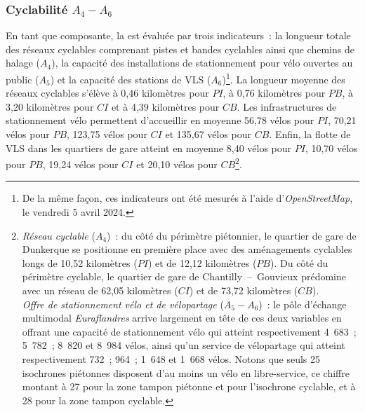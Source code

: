 \begin{refsegment}
\subsubsection*{Cyclabilité \(A_{4} - A_{6}\)
    \label{chap6:indicateurs-accessibility-cyclabilite}
    }

En tant que composante, la  est évaluée par trois indicateurs~: la longueur totale des réseaux cyclables comprenant pistes et bandes cyclables ainsi que chemins de halage (\(A_{4}\)), la capacité des installations de stationnement pour vélo ouvertes au public (\(A_{5}\)) et la capacité des stations de \acrshort{VLS} (\(A_{6}\))\footnote{
    De la même façon, ces indicateurs ont été mesurés à l'aide d'\textsl{OpenStreetMap}, le vendredi 5 avril 2024.
}. La longueur moyenne des réseaux cyclables s'élève à 0,46 kilomètres pour \(PI\), à 0,76 kilomètres pour \(PB\), à 3,20 kilomètres pour \(CI\) et à 4,39 kilomètres pour \(CB\). Les infrastructures de stationnement vélo permettent d'accueillir en moyenne 56,78 vélos pour \(PI\), 70,21 vélos pour \(PB\), 123,75 vélos pour \(CI\) et 135,67 vélos pour \(CB\). Enfin, la flotte de \acrshort{VLS} dans les quartiers de gare atteint en moyenne 8,40 vélos pour \(PI\), 10,70 vélos pour \(PB\), 19,24 vélos pour \(CI\) et 20,10 vélos pour \(CB\)\footnote{
    \textsl{Réseau cyclable} (\(A_{4}\))~: du côté du périmètre piétonnier, le quartier de gare de Dunkerque se positionne en première place avec des aménagements cyclables longs de 10,52 kilomètres (\(PI\)) et de 12,12 kilomètres (\(PB\)). Du côté du périmètre cyclable, le quartier de gare de Chantilly~–~Gouvieux prédomine avec un réseau de 62,05 kilomètres (\(CI\)) et de 73,72 kilomètres (\(CB\)).
    \\
    \textsl{Offre de stationnement vélo et de vélopartage} (\(A_{5} - A_{6}\))~: le pôle d'échange multimodal \textsl{Euraflandres} arrive largement en tête de ces deux variables en offrant une capacité de stationnement vélo qui atteint respectivement 4~683~; 5~782~; 8~820 et 8~984 vélos, ainsi qu'un service de vélopartage qui atteint respectivement 732~; 964~; 1~648 et 1~668 vélos. Notons que seuls 25 isochrones piétonnes disposent d'au moins un vélo en libre-service, ce chiffre montant à 27 pour la zone tampon piétonne et pour l'isochrone cyclable, et à 28 pour la zone tampon cyclable.
}.%


\end{refsegment}
